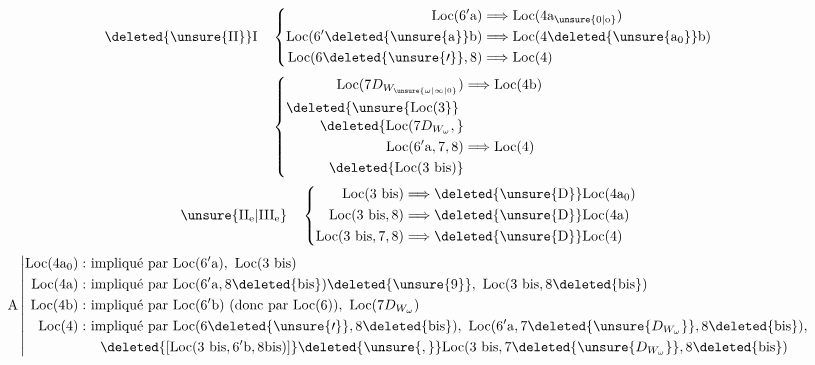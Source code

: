 \[
\deleted{\unsure{\mathrm{II}}}\mathrm{I}\quad
\left\{\begin{aligned}
\mathrm{Loc}(6'\mathrm{a})&\Longrightarrow\mathrm{Loc}(4\mathrm{a}_{\unsure{0|\mathrm{o}}})\\
\mathrm{Loc}(6'\deleted{\unsure{\mathrm{a}}}\mathrm{b})&\Longrightarrow\mathrm{Loc}(4\deleted{\unsure{\mathrm{a}_{0}}}\mathrm{b})\\
\mathrm{Loc}(6\deleted{\unsure{\prime}},8)&\Longrightarrow\mathrm{Loc}(4)
\end{aligned}\right.
\]
\[
\left\{\begin{aligned}
\mathrm{Loc}(7D_{W_{\unsure{\omega|\infty|0}}})&\Longrightarrow\mathrm{Loc}(4\mathrm{b})\\
\deleted{\unsure{\mathrm{Loc}(3}}\ &\\[-2pt]
\deleted{\mathrm{Loc}(7D_{W_{\omega}},} &\\
\mathrm{Loc}(6'\mathrm{a},7,8)&\Longrightarrow\mathrm{Loc}(4)\\
\deleted{\mathrm{Loc}(3\ \mathrm{bis})}&
\end{aligned}\right.
\]
\[
\unsure{\mathrm{II}_{\mathrm{e}}|\mathrm{III}_{\mathrm{e}}}\quad
\left\{\begin{aligned}
\mathrm{Loc}(3\ \mathrm{bis})&\Longrightarrow\deleted{\unsure{\mathrm{D}}}\mathrm{Loc}(4\mathrm{a}_{0})\\
\mathrm{Loc}(3\ \mathrm{bis},8)&\Longrightarrow\deleted{\unsure{\mathrm{D}}}\mathrm{Loc}(4\mathrm{a})\\
\mathrm{Loc}(3\ \mathrm{bis},7,8)&\Longrightarrow\deleted{\unsure{\mathrm{D}}}\mathrm{Loc}(4)
\end{aligned}\right.
\]
\[
\mathrm A\left|\begin{aligned}
\mathrm{Loc}(4\mathrm{a}_{0}):&\ \text{impliqué par }\mathrm{Loc}(6'\mathrm{a}),\ \mathrm{Loc}(3\ \mathrm{bis})\\
\mathrm{Loc}(4\mathrm{a}):&\ \text{impliqué par }\mathrm{Loc}(6'\mathrm{a},8\deleted{\mathrm{bis}})\deleted{\unsure{9}},\ \mathrm{Loc}(3\ \mathrm{bis},8\deleted{\mathrm{bis}})\\
\mathrm{Loc}(4\mathrm{b}):&\ \text{impliqué par }\mathrm{Loc}(6'\mathrm{b})\ (\text{donc par }\mathrm{Loc}(6)),\ \mathrm{Loc}(7D_{W_{\omega}})\\
\mathrm{Loc}(4):&\ \text{impliqué par }\mathrm{Loc}(6\deleted{\unsure{\prime}},8\deleted{\mathrm{bis}}),\
\mathrm{Loc}(6'\mathrm{a},7\deleted{\unsure{D_{W_{\omega}}}},8\deleted{\mathrm{bis}}),\\
&\quad\deleted{[\mathrm{Loc}(3\ \mathrm{bis},6'\mathrm{b},8\mathrm{bis})]}\deleted{\unsure{,}}
\mathrm{Loc}(3\ \mathrm{bis},7\deleted{\unsure{D_{W_{\omega}}}},8\deleted{\mathrm{bis}})
\end{aligned}\right.
\]
